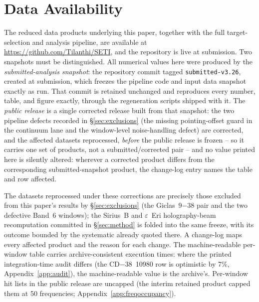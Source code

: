 \documentclass{openjournal}
\begin{document}
\section*{Data Availability}
The reduced data products underlying this paper, together with the
full target-selection and analysis pipeline, are available at
\url{https://github.com/Tilanthi/SETI}, and the repository is live at
submission. Two snapshots must be distinguished. All numerical values
here were produced by the \emph{submitted-analysis snapshot}: the
repository commit tagged \texttt{submitted-v3.26}, created at
submission, which freezes the pipeline code and input data snapshot
exactly as run. That commit is retained unchanged and reproduces
every number, table, and figure exactly, through the regeneration
scripts shipped with it. The \emph{public release} is a single
corrected release built from that snapshot: the two pipeline defects
recorded in \S\ref{sec:exclusions} (the missing pointing-offset guard
in the continuum lane and the window-level noise-handling defect) are
corrected, and the affected datasets reprocessed, \emph{before} the
public release is frozen -- so it carries one set of products, not a
submitted/corrected pair -- and no value printed here is silently
altered: wherever a corrected product differs from the corresponding
submitted-snapshot product, the change-log entry names the table and
row affected.

The datasets reprocessed under these corrections are precisely those
excluded from this paper's results by \S\ref{sec:exclusions} (the
Giclas~9$-$38 pair and the two defective Band~6 windows); the
Sirius~B and $\varepsilon$~Eri holography-beam recomputation
committed in \S\ref{sec:method} is folded into the same freeze, with
its outcome bounded by the systematic already quoted there. A
change-log maps every affected product and the reason for each
change. The machine-readable per-window table carries
archive-consistent execution times: where the printed
integration-time audit differs (the CD$-$38~10980 row is optimistic
by 7\%, Appendix~\ref{app:audit}), the machine-readable value is the
archive's. Per-window hit lists in the public release are uncapped
(the interim retained product capped them at 50 frequencies;
Appendix~\ref{app:freqoccupancy}).
\end{document}
